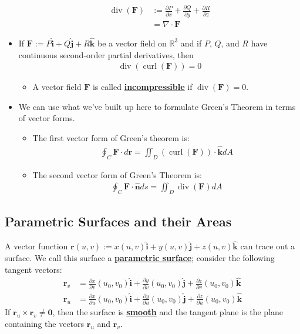\documentclass[reqno,11pt]{amsart}
\theoremstyle{definition}
\theoremstyle{remark}
\newcommand{\R}{\mathbb{R}}
\newcommand{\dfn}[1]{\underline{\textbf{#1}}}
\begin{document}
\begin{itemize}[noitemsep]
	\begin{align}
		\operatorname{div}(\mathbf{F}) & := \frac{\partial P}{\partial x} + \frac{\partial Q}{\partial y} + \frac{\partial R}{\partial z}	\\
			& = \nabla \cdot \mathbf{F} 
	\end{align}
	\item If $\mathbf{F} := P \hat{\mathbf{i}} + Q \hat{\mathbf{j}} + R \hat{\mathbf{k}}$ be a vector field on $\R^3$ and if $P$, $Q$, and $R$ have continuous second-order partial derivatives, then 
	\begin{align}
		\operatorname{div}( \operatorname{curl}(\mathbf{F})) = 0 	
	\end{align}
	\begin{itemize}[noitemsep]
		\item A vector field $\mathbf{F}$ is called \dfn{incompressible} if $\operatorname{div}(\mathbf{F}) =0$. 
	\end{itemize}
	\item We can use what we've built up here to formulate Green's Theorem in terms of vector forms. 
	\begin{itemize}[noitemsep]	
		\item The first vector form of Green's theorem is: 
		\begin{align}
			\oint_C \mathbf{F} \cdot d \mathbf{r} 	= \iint_D ( \operatorname{curl}(\mathbf{F})) \cdot \mathbf{\hat{k}} d A 
		\end{align}
		\item The second vector form of Green's Theorem is: 
		\begin{align}
			\oint_C \mathbf{F} \cdot \mathbf{\hat{n}}	ds = \iint_D \operatorname{div}(\mathbf{F}) dA
		\end{align}
	\end{itemize}
\end{itemize}

\subsection{Parametric Surfaces and their Areas}
A vector function $\mathbf{r}(u,v) := x(u,v) \mathbf{\hat{i}} + y(u,v) \mathbf{\hat{j}} + z(u,v) \hat{\mathbf{k}}$ can trace out a surface. We call this surface a \dfn{parametric surface}; consider the following tangent vectors: 
\begin{align}
	\mathbf{r}_v &  = \frac{\partial x}{\partial v}(u_0, v_0) \hat{\mathbf{i}} + \frac{\partial y}{\partial v}(u_0, v_0) \hat{\mathbf{j}} + \frac{\partial z}{\partial v}(u_0, v_0) \hat{\mathbf{k}} 	 \\
	\mathbf{r}_u &  = \frac{\partial x}{\partial u}(u_0, v_0) \hat{\mathbf{i}} + \frac{\partial y}{\partial u}(u_0, v_0) \hat{\mathbf{j}} + \frac{\partial z}{\partial u}(u_0, v_0) \hat{\mathbf{k}} 	 	
\end{align}
If $\mathbf{r}_u \times \mathbf{r}_v \neq \mathbf{0}$, then the surface is \dfn{smooth} and the tangent plane is the plane containing the vectors $\mathbf{r}_u$ and $\mathbf{r}_v$.
\end{document}
